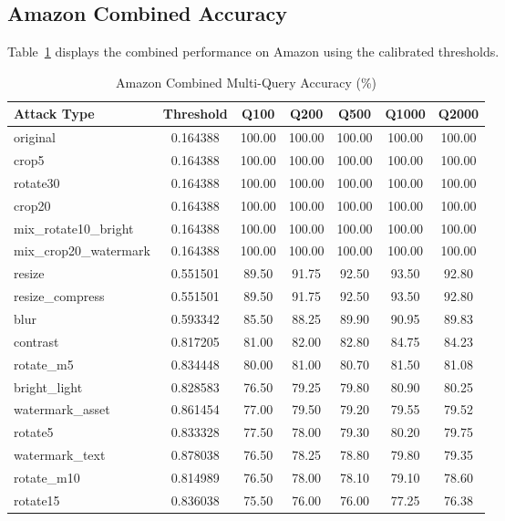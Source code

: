 \documentclass[11pt,a4paper]{article}
\begin{document}
\subsection{Amazon Combined Accuracy}
Table~\ref{tab:amazon_combined} displays the combined performance on Amazon using the calibrated thresholds.

\begin{table}[H]
\centering
\small
\renewcommand{\arraystretch}{0.85}
\caption{Amazon Combined Multi-Query Accuracy (\%)}
\label{tab:amazon_combined}
\begin{tabular}{lcccccc}
\toprule
\textbf{Attack Type} & \textbf{Threshold} & \textbf{Q100} & \textbf{Q200} & \textbf{Q500} & \textbf{Q1000} & \textbf{Q2000} \\
\midrule
original & 0.164388 & 100.00 & 100.00 & 100.00 & 100.00 & 100.00 \\
crop5 & 0.164388 & 100.00 & 100.00 & 100.00 & 100.00 & 100.00 \\
rotate30 & 0.164388 & 100.00 & 100.00 & 100.00 & 100.00 & 100.00 \\
crop20 & 0.164388 & 100.00 & 100.00 & 100.00 & 100.00 & 100.00 \\
mix\_rotate10\_bright & 0.164388 & 100.00 & 100.00 & 100.00 & 100.00 & 100.00 \\
mix\_crop20\_watermark & 0.164388 & 100.00 & 100.00 & 100.00 & 100.00 & 100.00 \\
resize & 0.551501 & 89.50 & 91.75 & 92.50 & 93.50 & 92.80 \\
resize\_compress & 0.551501 & 89.50 & 91.75 & 92.50 & 93.50 & 92.80 \\
blur & 0.593342 & 85.50 & 88.25 & 89.90 & 90.95 & 89.83 \\
contrast & 0.817205 & 81.00 & 82.00 & 82.80 & 84.75 & 84.23 \\
rotate\_m5 & 0.834448 & 80.00 & 81.00 & 80.70 & 81.50 & 81.08 \\
bright\_light & 0.828583 & 76.50 & 79.25 & 79.80 & 80.90 & 80.25 \\
watermark\_asset & 0.861454 & 77.00 & 79.50 & 79.20 & 79.55 & 79.52 \\
rotate5 & 0.833328 & 77.50 & 78.00 & 79.30 & 80.20 & 79.75 \\
watermark\_text & 0.878038 & 76.50 & 78.25 & 78.80 & 79.80 & 79.35 \\
rotate\_m10 & 0.814989 & 76.50 & 78.00 & 78.10 & 79.10 & 78.60 \\
rotate15 & 0.836038 & 75.50 & 76.00 & 76.00 & 77.25 & 76.38 \\

\end{tabular}
\end{table}
\end{document}
